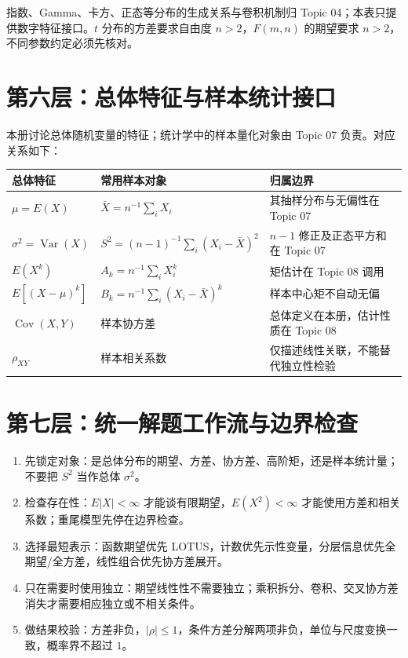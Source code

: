 \documentclass[11pt,a4paper]{ctexart}
\begin{document}
指数、Gamma、卡方、正态等分布的生成关系与卷积机制归 Topic 04；本表只提供数字特征接口。$t$ 分布的方差要求自由度 $n>2$，$F(m,n)$ 的期望要求 $n>2$，不同参数约定必须先核对。

\section{第六层：总体特征与样本统计接口}

本册讨论总体随机变量的特征；统计学中的样本量化对象由 Topic 07 负责。对应关系如下：
\begin{center}
\begin{tabularx}{\linewidth}{L{3.1cm}L{4.2cm}Y}
\toprule
总体特征 & 常用样本对象 & 归属边界\\
\midrule
$\mu=E(X)$ & $\bar X=n^{-1}\sum_iX_i$ & 其抽样分布与无偏性在 Topic 07\\
$\sigma^2=\operatorname{Var}(X)$ & $S^2=(n-1)^{-1}\sum_i(X_i-\bar X)^2$ & $n-1$ 修正及正态平方和在 Topic 07\\
$E(X^k)$ & $A_k=n^{-1}\sum_iX_i^k$ & 矩估计在 Topic 08 调用\\
$E[(X-\mu)^k]$ & $B_k=n^{-1}\sum_i(X_i-\bar X)^k$ & 样本中心矩不自动无偏\\
$\operatorname{Cov}(X,Y)$ & 样本协方差 & 总体定义在本册，估计性质在 Topic 08\\
$\rho_{XY}$ & 样本相关系数 & 仅描述线性关联，不能替代独立性检验\\
\bottomrule
\end{tabularx}
\end{center}

\section{第七层：统一解题工作流与边界检查}

\begin{enumerate}
  \item 先锁定对象：是总体分布的期望、方差、协方差、高阶矩，还是样本统计量；不要把 $S^2$ 当作总体 $\sigma^2$。
  \item 检查存在性：$E|X|<\infty$ 才能谈有限期望，$E(X^2)<\infty$ 才能使用方差和相关系数；重尾模型先停在边界检查。
  \item 选择最短表示：函数期望优先 LOTUS，计数优先示性变量，分层信息优先全期望/全方差，线性组合优先协方差展开。
  \item 只在需要时使用独立：期望线性性不需要独立；乘积拆分、卷积、交叉协方差消失才需要相应独立或不相关条件。
  \item 做结果校验：方差非负，$|\rho|\leq1$，条件方差分解两项非负，单位与尺度变换一致，概率界不超过 $1$。
\end{enumerate}
\end{document}
